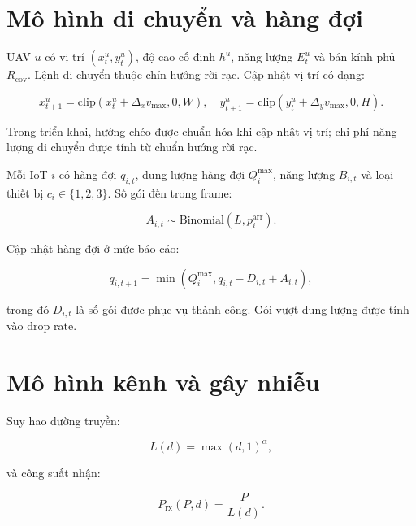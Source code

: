 \section{Mô hình di chuyển và hàng đợi}

UAV \(u\) có vị trí \((x^u_t,y^u_t)\), độ cao cố định \(h^u\), năng lượng \(E^u_t\) và bán kính phủ \(R_{\mathrm{cov}}\). Lệnh di chuyển thuộc chín hướng rời rạc. Cập nhật vị trí có dạng:

\begin{equation}
x^u_{t+1}=\mathrm{clip}(x^u_t+\Delta_x v_{\max},0,W),\quad
y^u_{t+1}=\mathrm{clip}(y^u_t+\Delta_y v_{\max},0,H).
\label{eq:uav_mobility}
\end{equation}

Trong triển khai, hướng chéo được chuẩn hóa khi cập nhật vị trí; chi phí năng lượng di chuyển được tính từ chuẩn hướng rời rạc.

Mỗi IoT \(i\) có hàng đợi \(q_{i,t}\), dung lượng hàng đợi \(Q_i^{\max}\), năng lượng \(B_{i,t}\) và loại thiết bị \(c_i\in\{1,2,3\}\). Số gói đến trong frame:

\begin{equation}
A_{i,t}\sim\mathrm{Binomial}(L,p_i^{\mathrm{arr}}).
\label{eq:arrival}
\end{equation}

Cập nhật hàng đợi ở mức báo cáo:

\begin{equation}
q_{i,t+1}=\min\!\left(Q_i^{\max},q_{i,t}-D_{i,t}+A_{i,t}\right),
\label{eq:queue_update}
\end{equation}

trong đó \(D_{i,t}\) là số gói được phục vụ thành công. Gói vượt dung lượng được tính vào drop rate.

\section{Mô hình kênh và gây nhiễu}

Suy hao đường truyền:

\begin{equation}
L(d)=\max(d,1)^{\alpha},
\label{eq:path_loss}
\end{equation}

và công suất nhận:

\begin{equation}
P_{\mathrm{rx}}(P,d)=\frac{P}{L(d)}.
\label{eq:received_power}
\end{equation}

